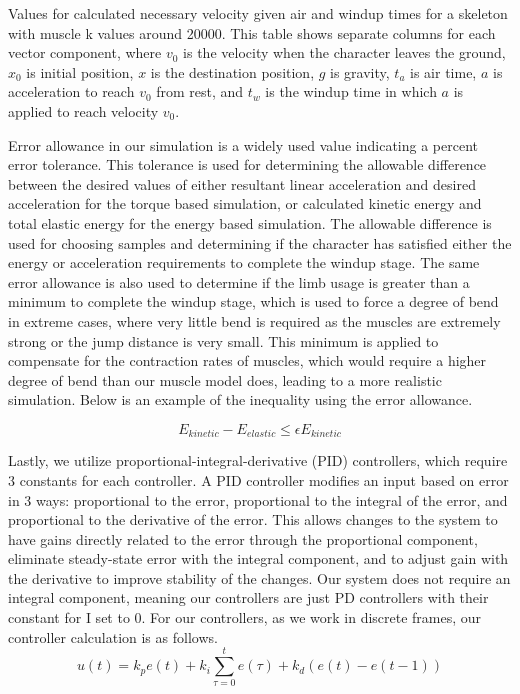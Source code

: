\begin{table}[ht]
	\centering
	
	\caption{Values for calculated necessary velocity given air and windup times for a skeleton with muscle k values around 20000. This table shows separate columns for each vector component, where $v_0$ is the velocity when the character leaves the ground, $x_0$ is initial position, $x$ is the destination position, $g$ is gravity, $t_a$ is air time, $a$ is acceleration to reach $v_0$ from rest, and $t_w$ is the windup time in which $a$ is applied to reach velocity $v_0$.}
\end{table}

Error allowance in our simulation is a widely used value indicating a percent error tolerance.  This tolerance is used for determining the allowable difference between the desired values of either resultant linear acceleration and desired acceleration for the torque based simulation, or calculated kinetic energy and total elastic energy for the energy based simulation.  The allowable difference is used for choosing samples and determining if the character has satisfied either the energy or acceleration requirements to complete the windup stage.  The same error allowance is also used to determine if the limb usage is greater than a minimum to complete the windup stage, which is used to force a degree of bend in extreme cases, where very little bend is required as the muscles are extremely strong or the jump distance is very small.  This minimum is applied to compensate for the contraction rates of muscles, which would require a higher degree of bend than our muscle model does, leading to a more realistic simulation.  Below is an example of the inequality using the error allowance.

\[
	E_{kinetic} - E_{elastic} \le \epsilon E_{kinetic}
\]

Lastly, we utilize proportional-integral-derivative (PID) controllers, which require 3 constants for each controller.  A PID controller modifies an input based on error in 3 ways: proportional to the error, proportional to the integral of the error, and proportional to the derivative of the error.  This allows changes to the system to have gains directly related to the error through the proportional component, eliminate steady-state error with the integral component, and to adjust gain with the derivative to improve stability of the changes.  Our system does not require an integral component, meaning our controllers are just PD controllers with their constant for I set to 0.  For our controllers, as we work in discrete frames, our controller calculation is as follows.
\[
	u(t) = k_p e(t) + k_i \displaystyle\sum_{\tau = 0}^t e(\tau) + k_d \left( e(t) - e(t-1) \right)
\]

